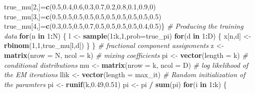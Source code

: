 \documentclass[]{article}
\newenvironment{Shaded}{\begin{snugshade}}{\end{snugshade}}
\newcommand{\KeywordTok}[1]{\textcolor[rgb]{0.13,0.29,0.53}{\textbf{#1}}}
\newcommand{\DataTypeTok}[1]{\textcolor[rgb]{0.13,0.29,0.53}{#1}}
\newcommand{\DecValTok}[1]{\textcolor[rgb]{0.00,0.00,0.81}{#1}}
\newcommand{\FloatTok}[1]{\textcolor[rgb]{0.00,0.00,0.81}{#1}}
\newcommand{\StringTok}[1]{\textcolor[rgb]{0.31,0.60,0.02}{#1}}
\newcommand{\CommentTok}[1]{\textcolor[rgb]{0.56,0.35,0.01}{\textit{#1}}}
\newcommand{\ControlFlowTok}[1]{\textcolor[rgb]{0.13,0.29,0.53}{\textbf{#1}}}
\newcommand{\OperatorTok}[1]{\textcolor[rgb]{0.81,0.36,0.00}{\textbf{#1}}}
\newcommand{\NormalTok}[1]{#1}
\begin{document}
\begin{Shaded}
\begin{Highlighting}[]
\NormalTok{true_mu[}\DecValTok{2}\NormalTok{,]=}\KeywordTok{c}\NormalTok{(}\FloatTok{0.5}\NormalTok{,}\FloatTok{0.4}\NormalTok{,}\FloatTok{0.6}\NormalTok{,}\FloatTok{0.3}\NormalTok{,}\FloatTok{0.7}\NormalTok{,}\FloatTok{0.2}\NormalTok{,}\FloatTok{0.8}\NormalTok{,}\FloatTok{0.1}\NormalTok{,}\FloatTok{0.9}\NormalTok{,}\DecValTok{0}\NormalTok{)}
\NormalTok{true_mu[}\DecValTok{3}\NormalTok{,]=}\KeywordTok{c}\NormalTok{(}\FloatTok{0.5}\NormalTok{,}\FloatTok{0.5}\NormalTok{,}\FloatTok{0.5}\NormalTok{,}\FloatTok{0.5}\NormalTok{,}\FloatTok{0.5}\NormalTok{,}\FloatTok{0.5}\NormalTok{,}\FloatTok{0.5}\NormalTok{,}\FloatTok{0.5}\NormalTok{,}\FloatTok{0.5}\NormalTok{,}\FloatTok{0.5}\NormalTok{)}
\NormalTok{true_mu[}\DecValTok{4}\NormalTok{,]=}\KeywordTok{c}\NormalTok{(}\FloatTok{0.3}\NormalTok{,}\FloatTok{0.5}\NormalTok{,}\FloatTok{0.5}\NormalTok{,}\FloatTok{0.7}\NormalTok{,}\FloatTok{0.5}\NormalTok{,}\FloatTok{0.5}\NormalTok{,}\FloatTok{0.5}\NormalTok{,}\FloatTok{0.5}\NormalTok{,}\FloatTok{0.4}\NormalTok{,}\FloatTok{0.5}\NormalTok{)\}}
\CommentTok{# Producing the training data}
\ControlFlowTok{for}\NormalTok{(n }\ControlFlowTok{in} \DecValTok{1}\OperatorTok{:}\NormalTok{N) \{}
\NormalTok{l <-}\StringTok{ }\KeywordTok{sample}\NormalTok{(}\DecValTok{1}\OperatorTok{:}\NormalTok{k,}\DecValTok{1}\NormalTok{,}\DataTypeTok{prob=}\NormalTok{true_pi)}
\ControlFlowTok{for}\NormalTok{(d }\ControlFlowTok{in} \DecValTok{1}\OperatorTok{:}\NormalTok{D) \{}
\NormalTok{x[n,d] <-}\StringTok{ }\KeywordTok{rbinom}\NormalTok{(}\DecValTok{1}\NormalTok{,}\DecValTok{1}\NormalTok{,true_mu[l,d])}
\NormalTok{\}}
\NormalTok{\}}
\CommentTok{# fractional component assignments}
\NormalTok{z <-}\StringTok{ }\KeywordTok{matrix}\NormalTok{(}\DataTypeTok{nrow =}\NormalTok{ N, }\DataTypeTok{ncol =}\NormalTok{ k)}
\CommentTok{# mixing coefficients}
\NormalTok{pi <-}\StringTok{ }\KeywordTok{vector}\NormalTok{(}\DataTypeTok{length =}\NormalTok{ k)}
\CommentTok{# conditional distributions}
\NormalTok{mu <-}\StringTok{ }\KeywordTok{matrix}\NormalTok{(}\DataTypeTok{nrow =}\NormalTok{ k, }\DataTypeTok{ncol =}\NormalTok{ D)}
\CommentTok{# log likelihood of the EM iterations}
\NormalTok{llik <-}\StringTok{ }\KeywordTok{vector}\NormalTok{(}\DataTypeTok{length =}\NormalTok{ max_it)}
\CommentTok{# Random initialization of the paramters}
\NormalTok{pi <-}\StringTok{ }\KeywordTok{runif}\NormalTok{(k,}\FloatTok{0.49}\NormalTok{,}\FloatTok{0.51}\NormalTok{)}
\NormalTok{pi <-}\StringTok{ }\NormalTok{pi }\OperatorTok{/}\StringTok{ }\KeywordTok{sum}\NormalTok{(pi)}
\ControlFlowTok{for}\NormalTok{(i }\ControlFlowTok{in} \DecValTok{1}\OperatorTok{:}\NormalTok{k) \{}

\end{Highlighting}
\end{Shaded}
\end{document}
